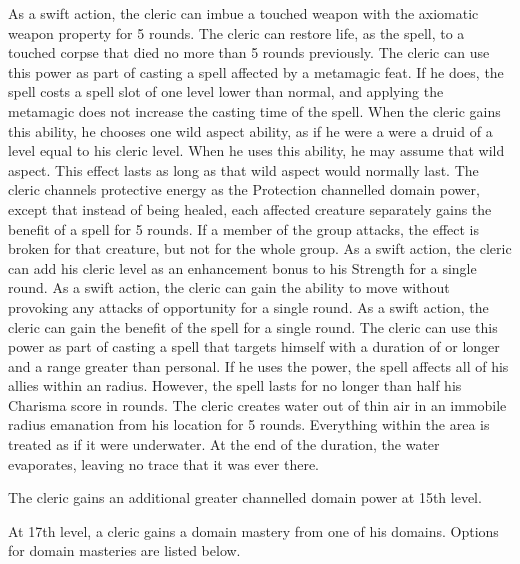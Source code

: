  As a swift action, the cleric can imbue a touched weapon with the axiomatic weapon property for 5 rounds.
 The cleric can restore life, as the  spell, to a touched corpse that died no more than 5 rounds previously.
 The cleric can use this power as part of casting a spell affected by a metamagic feat. If he does, the spell costs a spell slot of one level lower than normal, and applying the metamagic does not increase the casting time of the spell.
 When the cleric gains this ability, he chooses one wild aspect ability, as if he were a were a druid of a level equal to his cleric level. When he uses this ability, he may assume that wild aspect. This effect lasts as long as that wild aspect would normally last.
 The cleric channels protective energy as the Protection channelled domain power, except that instead of being healed, each affected creature separately gains the benefit of a  spell for 5 rounds.  If a member of the group attacks, the effect is broken for that creature, but not for the whole group.
 As a swift action, the cleric can add his cleric level as an enhancement bonus to his Strength for a single round.
 As a swift action, the cleric can gain the ability to move without provoking any attacks of opportunity for a single round.
 As a swift action, the cleric can gain the benefit of the  spell for a single round.
 The cleric can use this power as part of casting a spell that targets himself with a duration of \durshort or longer and a range greater than personal. If he uses the power, the spell affects all of his allies within an \areamed radius. However, the spell lasts for no longer than half his Charisma score in rounds.
 The cleric creates water out of thin air in an immobile \areamed radius emanation from his location for 5 rounds. Everything within the area is treated as if it were underwater. At the end of the duration, the water evaporates, leaving no trace that it was ever there.

\par The cleric gains an additional greater channelled domain power at 15th level.

 At 17th level, a cleric gains a domain mastery from one of his domains. Options for domain masteries are listed below.

